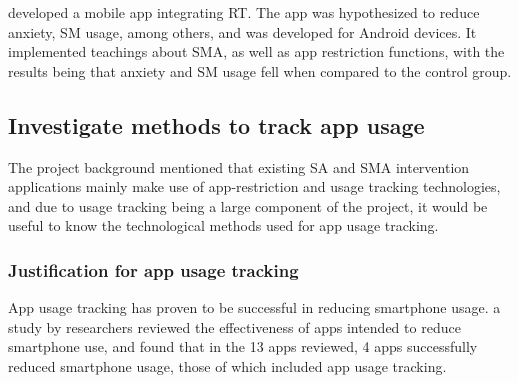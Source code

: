 \documentclass[12pt]{article}
\begin{document}

\textcite{RefWorks:RefID:42-esmaeili2018method} developed a mobile app 
integrating RT. The app was hypothesized to reduce anxiety, SM usage, among others, and was developed for Android 
devices. It implemented teachings about SMA, as well as app restriction functions, with the results being that 
anxiety and SM usage fell when compared to the control group.


\subsection{Investigate methods to track app usage}
The project background mentioned that existing SA and SMA intervention applications mainly make use of 
app-restriction and usage tracking technologies, and due to usage tracking being a large component of the project, 
it would be useful to know the technological methods used for app usage tracking.


\subsubsection{Justification for app usage tracking}

App usage tracking has proven to be successful in reducing smartphone usage. a
study by researchers \textcite{RefWorks:RefID:125-rahmillah2023evaluating} reviewed the effectiveness of apps 
intended to reduce smartphone use, and found that in the 13 apps reviewed, 4 apps successfully reduced smartphone 
usage, those of which included app usage tracking.
\end{document}
